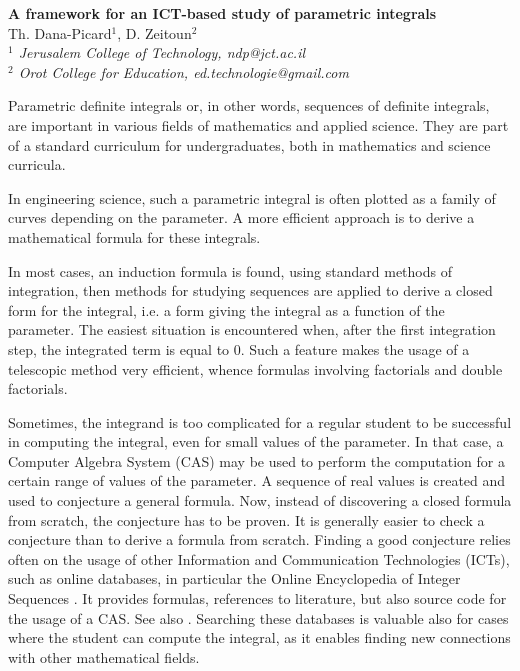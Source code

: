 \documentclass[11pt]{article}
\begin{document}
%
\vspace{-0.8cm}
\begin{flushleft}
\Large \textbf{\noindent
A framework for an ICT-based study of parametric integrals}
\\
\vspace{0.5cm}
\normalsize
\normalsize{
 Th. Dana-Picard$^1$, D. Zeitoun$^2$
} \\
\vspace{5mm}
\textit{\footnotesize
$^1$ Jerusalem College of Technology, ndp@jct.ac.il\\
$^2$ Orot College for Education, ed.technologie@gmail.com
}
\end{flushleft}

Parametric definite integrals or, in other words, sequences of definite integrals, are important in various fields of mathematics and applied science.  They are part of a standard curriculum for undergraduates, both in mathematics and science curricula.

In engineering science, such a parametric integral is often plotted as a family of curves depending on the parameter. A more efficient approach is to derive a mathematical formula for these integrals.

In most cases, an induction formula is found, using standard methods of integration, then methods for studying sequences are applied to derive a closed form for the integral, i.e. a form giving the integral as a function of the parameter. The easiest situation is encountered when, after the first integration step, the integrated term is equal to 0. Such a feature makes the usage of a telescopic method very efficient, whence formulas involving factorials and double factorials.

Sometimes, the integrand is too complicated for a regular student to be successful in computing the integral, even for small values of the parameter. In that case, a Computer Algebra System (CAS) may be used to perform the computation for a certain range of values of the parameter. A sequence of real values is created and  used to conjecture a general formula. Now, instead of discovering a closed formula from scratch, the conjecture has to be proven. It is generally easier to check a conjecture than to derive a formula from scratch.
Finding a good conjecture relies often on the usage of other Information and Communication Technologies (ICTs), such as online databases, in particular the Online Encyclopedia  of Integer Sequences \cite{oeis}. It provides formulas, references to literature, but also source code for the usage of a CAS. See also \cite{dickau}. Searching these databases is valuable also for cases where the student can compute the integral, as it enables finding new connections with other mathematical fields.
\end{document}
